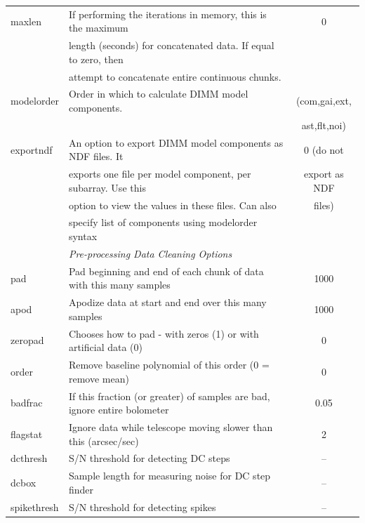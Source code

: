 \documentclass[twoside,11pt]{article}
\renewcommand{\_}{\texttt{\symbol{95}}}
\begin{document}
\begin{table}
\begin{tabular}{llc}
maxlen           & If performing the iterations in memory, this is the maximum         &    0 \\
                 & length (seconds) for concatenated data. If equal to zero, then      & \\
                 & attempt to concatenate entire continuous chunks.                    & \\
modelorder       & Order in which to calculate DIMM model components.                  & (com,gai,ext,\\
                 &                                                                     &  ast,flt,noi)\\
exportndf        & An option to export DIMM model components as NDF files. It          & 0 (do not\\
                 & exports one file per model component, per subarray. Use this        & export as NDF\\
                 & option to view the values in these files. Can also      & files)\\
                 & specify list of components using modelorder syntax                  & \\
\hline
                 & \multicolumn{2}{l}{\em Pre-processing Data Cleaning Options} \\
\hline
pad              & Pad beginning and end of each chunk of data with this many samples          & 1000 \\
apod             & Apodize data at start and end over this many samples                & 1000 \\
zeropad          & Chooses how to pad - with zeros (1) or with artificial data (0)     & 0 \\
order            & Remove baseline polynomial of this order (0 = remove mean)          & 0 \\
badfrac          & If this fraction (or greater) of samples are bad, ignore entire bolometer            & 0.05 \\
flagstat         & Ignore data while telescope moving slower than this (arcsec/sec)    & 2 \\
dcthresh         & S/N threshold for detecting DC steps                                & -- \\
dcbox            & Sample length for measuring noise for DC step finder                & -- \\
spikethresh      & S/N threshold for detecting spikes                                  & -- \\

\end{tabular}
\end{table}
\end{document}
